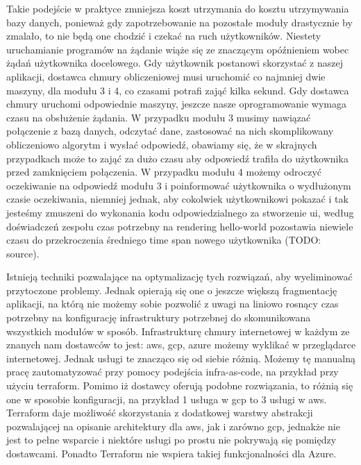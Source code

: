 Takie podejście w praktyce zmniejsza koszt utrzymania do kosztu utrzymywania bazy danych, ponieważ gdy zapotrzebowanie na pozostałe moduły drastycznie by zmalało, to nie będą one chodzić i czekać na ruch użytkowników.
Niestety uruchamianie programów na żądanie wiąże się ze znaczącym opóźnieniem wobec żądań użytkownika docelowego.
Gdy użytkownik postanowi skorzystać z naszej aplikacji, dostawca chmury obliczeniowej musi uruchomić co najmniej dwie maszyny, dla modułu 3 i 4, co czasami potrafi zająć kilka sekund.
Gdy dostawca chmury uruchomi odpowiednie maszyny, jeszcze nasze oprogramowanie wymaga czasu na obsłużenie żądania.
W przypadku modułu 3 musimy nawiązać połączenie z bazą danych, odczytać dane, zastosować na nich skomplikowany obliczeniowo algorytm i wysłać odpowiedź, obawiamy się, że w skrajnych przypadkach może to zająć za dużo czasu aby odpowiedź trafiła do użytkownika przed zamknięciem połączenia.
W przypadku modułu 4 możemy odroczyć oczekiwanie na odpowiedź modułu 3 i poinformować użytkownika o wydłużonym czasie oczekiwania, niemniej jednak, aby cokolwiek użytkownikowi pokazać i tak jesteśmy zmuszeni do wykonania kodu odpowiedzialnego za stworzenie \gls{ui}, według doświadczeń zespołu czas potrzebny na \gls{rendering} \gls{hello-world} pozostawia niewiele czasu do przekroczenia średniego time span nowego użytkownika (TODO: source).

Istnieją techniki pozwalające na optymalizację tych rozwiązań, aby wyeliminować przytoczone problemy.
Jednak opierają się one o jeszcze większą fragmentację aplikacji, na którą nie możemy sobie pozwolić z uwagi na liniowo rosnący czas potrzebny na konfigurację infrastruktury potrzebnej do skomunikowana wszystkich modułów w  sposób.
Infrastrukturę chmury internetowej w każdym ze znanych nam dostawców to jest: \acrshort{aws}, \acrshort{gcp}, \acrshort{azure} możemy wyklikać w przeglądarce internetowej.
Jednak usługi te znacząco się od siebie różnią.
Możemy tę manualną pracę zautomatyzować przy pomocy podejścia \gls{infra-as-code}, na przykład przy użyciu terraform.
Pomimo iż dostawcy oferują podobne rozwiązania, to różnią się one w sposobie konfiguracji, na przykład 1 usługa w \acrshort{gcp} to 3 usługi w \acrshort{aws}\@.
Terraform daje możliwość skorzystania z dodatkowej warstwy abstrakcji pozwalającej na opisanie architektury dla \acrshort{aws}, jak i zarówno \acrshort{gcp}, jednakże nie jest to pełne wsparcie i niektóre usługi po prostu nie pokrywają się pomiędzy dostawcami.
Ponadto Terraform nie wspiera takiej funkcjonalności dla Azure.

